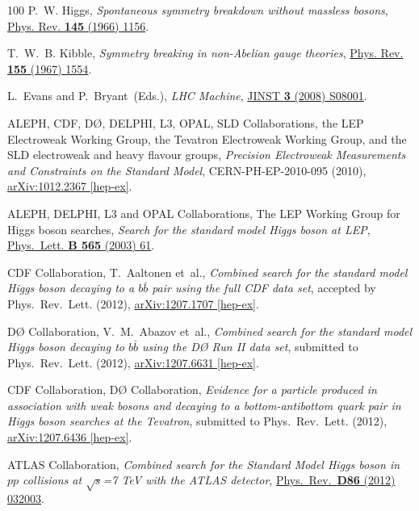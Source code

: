 \documentclass[final,3p,times,twocolumn]{elsarticle}
\begin{document}
\begin{thebibliography}{100}
P.~W. Higgs, {\em {Spontaneous symmetry breakdown without massless bosons}},
  \href{http://dx.doi.org/10.1103/PhysRev.145.1156}{Phys. Rev. {\bfseries 145}
  (1966) 1156}.

T.~W.~B. Kibble, {\em {Symmetry breaking in non-Abelian gauge theories}},
  \href{http://dx.doi.org/10.1103/PhysRev.155.1554}{Phys. Rev. {\bfseries 155}
  (1967) 1554}.

L.~Evans and P.~Bryant~(Eds.), {\em LHC Machine},
  \href{http://dx.doi.org/10.1088/1748-0221/3/08/S08001}{JINST {\bfseries 3}
  (2008) S08001}.

{ALEPH, CDF, D\O, DELPHI, L3, OPAL, SLD Collaborations, the LEP Electroweak
  Working Group, the Tevatron Electroweak Working Group, and the SLD
  electroweak and heavy flavour groups}, {\em Precision Electroweak
  Measurements and Constraints on the Standard Model}, {CERN-PH-EP-2010-095}
  (2010), \href{http://arxiv.org/abs/1012.2367}{{\ttfamily arXiv:1012.2367
  [hep-ex]}}.

{ALEPH, DELPHI, L3 and OPAL Collaborations, The LEP Working Group for Higgs boson searches, } {\em {Search for the standard model Higgs boson at LEP}},
  \href{http://dx.doi.org/10.1016/S0370-2693(03)00614-2}{Phys.~Lett. {\bfseries
  B 565} (2003) 61}.

{CDF} Collaboration, T.~Aaltonen {et~al.}, {\em {Combined search for the
  standard model Higgs boson decaying to a $b\bar{b}$ pair using the full CDF data
  set}}, accepted by Phys.\ Rev.\ Lett. (2012),
  \href{http://arxiv.org/abs/1207.1707}{{\ttfamily arXiv:1207.1707 [hep-ex]}}.

{D\O} Collaboration, V.~M.~Abazov {et~al.},
{\em {Combined search for the standard model Higgs boson
                        decaying to $b\bar{b}$ using the {D\O} Run II data set}}, 
 submitted to Phys.\ Rev.\  Lett. (2012),
  \href{http://arxiv.org/abs/1207.6631}{{\ttfamily arXiv:1207.6631 [hep-ex]}}.

{CDF Collaboration, {D\O}} Collaboration, {\em {Evidence for a particle produced
  in association with weak bosons and decaying to a bottom-antibottom quark
  pair in Higgs boson searches at the Tevatron}}, submitted to Phys.\ Rev.\
  Lett. (2012), \href{http://arxiv.org/abs/1207.6436}{{\ttfamily
  arXiv:1207.6436 [hep-ex]}}.

{ATLAS} Collaboration, {\em {Combined search for the Standard Model Higgs boson
  in $pp$ collisions at $\sqrt{s}$=7 TeV with the ATLAS detector}}, 
 \href{http://dx.doi.org/10.1103/PhysRevD.86.032003}{Phys.\ Rev.\ {\bfseries D86} (2012) 032003}.


\end{thebibliography}
\end{document}
